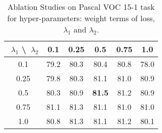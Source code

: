 \begin{table}[h]
    \centering
    \caption{Ablation Studies on Pascal VOC 15-1 task for hyper-parameters: weight terms of loss,  \(\lambda_1\) and \(\lambda_2\).}
    \begin{tabular}{c|c c c c c}
         \toprule\(\)
         \(\lambda_1\) \textbackslash ~\(\lambda_2\) & 0.1 & 0.25 & 0.5 & 0.75 & 1.0 \\
         \midrule
         0.1 & 79.2 & 80.3 & 80.4 & 80.8 & 78.0 \\
         0.25 & 79.8 & 80.3 & 81.1 & 81.0 & 80.9 \\
         0.5 & 80.3 & 80.9 & \textbf{81.5} & 81.2 &  80.9 \\
         0.75 & 81.1 & 81.3 & 81.1 & 81.0 & 81.0 \\
         1.0 & 80.8 & 81.3 & 81.1 & 81.2 & 80.1 \\
         \bottomrule
    \end{tabular}
    \label{tab:loss_weight}
\end{table}

